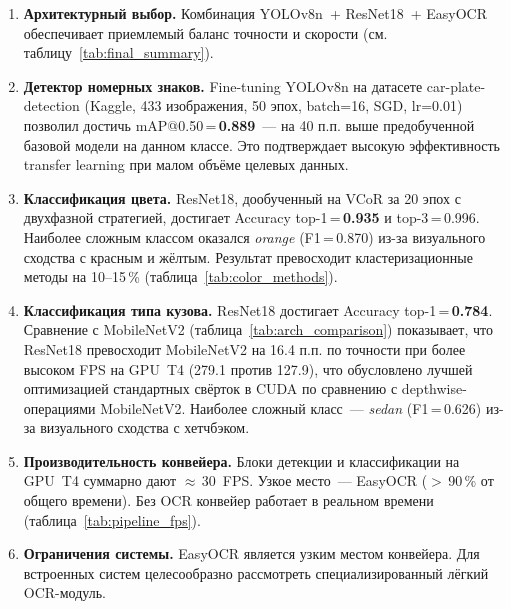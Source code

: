 \documentclass[14pt,a4paper]{report}
\numberwithin{equation}{chapter}
\numberwithin{figure}{chapter}
\numberwithin{table}{chapter}
\begin{document}
\begin{enumerate}
  \item \textbf{Архитектурный выбор.}
        Комбинация YOLOv8n~+ ResNet18~+ EasyOCR обеспечивает приемлемый баланс
        точности и скорости (см. таблицу~\ref{tab:final_summary}).

  \item \textbf{Детектор номерных знаков.}
        Fine-tuning YOLOv8n на датасете car-plate-detection (Kaggle, 433 изображения, 50 эпох, batch=16,
        SGD, lr=0.01) позволил достичь mAP@0.50\,=\,\textbf{0.889}~---
        на 40 п.п. выше предобученной базовой модели на данном классе.
        Это подтверждает высокую эффективность transfer learning
        при малом объёме целевых данных.

  \item \textbf{Классификация цвета.}
        ResNet18, дообученный на VCoR за 20 эпох с двухфазной стратегией,
        достигает Accuracy top-1\,=\,\textbf{0.935} и top-3\,=\,0.996.
        Наиболее сложным классом оказался \textit{orange} (F1\,=\,0.870)
        из-за визуального сходства с красным и жёлтым.
        Результат превосходит кластеризационные методы на 10--15\,\%
        (таблица~\ref{tab:color_methods}).

  \item \textbf{Классификация типа кузова.}
        ResNet18 достигает Accuracy top-1\,=\,\textbf{0.784}.
        Сравнение с MobileNetV2 (таблица~\ref{tab:arch_comparison})
        показывает, что ResNet18 превосходит MobileNetV2 на 16.4 п.п.
        по точности при более высоком FPS на GPU~T4
        (279.1 против 127.9), что обусловлено лучшей
        оптимизацией стандартных свёрток в CUDA по сравнению
        с depthwise-операциями MobileNetV2.
        Наиболее сложный класс~--- \textit{sedan} (F1\,=\,0.626)
        из-за визуального сходства с хетчбэком.

  \item \textbf{Производительность конвейера.}
        Блоки детекции и классификации на GPU~T4 суммарно дают
        $\approx$\,30~FPS. Узкое место~--- EasyOCR ($>$\,90\,\%
        от общего времени). Без OCR конвейер работает в реальном
        времени (таблица~\ref{tab:pipeline_fps}).

  \item \textbf{Ограничения системы.}
        EasyOCR является узким местом конвейера. Для встроенных систем
        целесообразно рассмотреть специализированный лёгкий OCR-модуль.
\end{enumerate}
\end{document}
